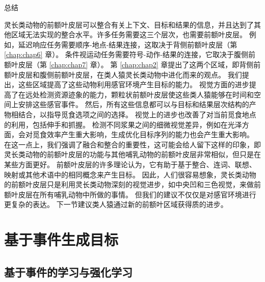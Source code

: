 总结

灵长类动物的前额叶皮层可以整合有关上下文、目标和结果的信息，并且达到了其他区域无法实现的整合水平。许多任务需要这三个层次，也需要前额叶皮层。
例如，延迟响应任务需要顺序-地点-结果连接，这取决于背侧前额叶皮层（第 \ref{chap:chap6} 章）。
条件视运动任务需要符号-动作-结果的连接，它取决于腹侧前额叶皮层（第 \ref{chap:chap7} 章）。
第 \ref{chap:chap2} 章提出了这两个区域，即背侧前额叶皮层和腹侧前额叶皮层，在类人猿灵长类动物中进化而来的观点。
我们提出，这些区域提高了这些动物利用感官环境产生目标的能力。
视觉方面的进步提高了在远处检测资源迹象的能力，颗粒状前额叶皮层使这些类人猿能够在时间和空间上安排这些感官事件。
然后，所有这些信息都可以与目标和结果层次结构的产物相结合，以指导觅食选项之间的选择。
视觉上的进步也改善了对当前觅食地点的利用，包括伸手和抓握。
检测不同浆果之间的细微视觉差异，例如在光泽方面，会对觅食效率产生重大影响，生成优化目标序列的能力也会产生重大影响。
在这一点上，我们强调了融合和整合的重要性，这可能会给人留下这样的印象，即灵长类动物的前额叶皮层的功能与其他哺乳动物的前额叶皮层非常相似，但只是在某些方面更好。
前额叶皮层的许多理论认为，它有助于基于整合、连词、联想、映射或其他术语中的相同概念来产生目标。
因此，人们很容易想象，灵长类动物的前额叶皮层只是利用灵长类动物深刻的视觉进步，如中央凹和三色视觉，来做前额叶皮层在所有哺乳动物中所做的事情。
但我们的建议不仅仅是对感官环境进行更复杂的表达。
下一节建议类人猿通过新的前额叶区域获得质的进步。



\section{基于事件生成目标}

\subsection{基于事件的学习与强化学习}

